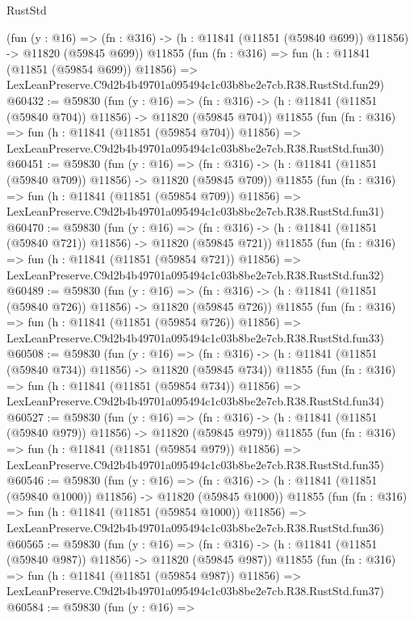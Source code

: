 \begin{lexlean}{RustStd}
\begin{coremodule}
    (fun (y : @16) =>
    (fn : @316) -> (h : @11841 (@11851 (@59840 @699)) @11856) -> @11820 (@59845 @699))
    @11855
    (fun (fn : @316) =>
    fun (h : @11841 (@11851 (@59854 @699)) @11856) =>
    LexLeanPreserve.C9d2b4b49701a095494c1c03b8be2e7cb.R38.RustStd.fun29)
@60432 := @59830
    (fun (y : @16) =>
    (fn : @316) -> (h : @11841 (@11851 (@59840 @704)) @11856) -> @11820 (@59845 @704))
    @11855
    (fun (fn : @316) =>
    fun (h : @11841 (@11851 (@59854 @704)) @11856) =>
    LexLeanPreserve.C9d2b4b49701a095494c1c03b8be2e7cb.R38.RustStd.fun30)
@60451 := @59830
    (fun (y : @16) =>
    (fn : @316) -> (h : @11841 (@11851 (@59840 @709)) @11856) -> @11820 (@59845 @709))
    @11855
    (fun (fn : @316) =>
    fun (h : @11841 (@11851 (@59854 @709)) @11856) =>
    LexLeanPreserve.C9d2b4b49701a095494c1c03b8be2e7cb.R38.RustStd.fun31)
@60470 := @59830
    (fun (y : @16) =>
    (fn : @316) -> (h : @11841 (@11851 (@59840 @721)) @11856) -> @11820 (@59845 @721))
    @11855
    (fun (fn : @316) =>
    fun (h : @11841 (@11851 (@59854 @721)) @11856) =>
    LexLeanPreserve.C9d2b4b49701a095494c1c03b8be2e7cb.R38.RustStd.fun32)
@60489 := @59830
    (fun (y : @16) =>
    (fn : @316) -> (h : @11841 (@11851 (@59840 @726)) @11856) -> @11820 (@59845 @726))
    @11855
    (fun (fn : @316) =>
    fun (h : @11841 (@11851 (@59854 @726)) @11856) =>
    LexLeanPreserve.C9d2b4b49701a095494c1c03b8be2e7cb.R38.RustStd.fun33)
@60508 := @59830
    (fun (y : @16) =>
    (fn : @316) -> (h : @11841 (@11851 (@59840 @734)) @11856) -> @11820 (@59845 @734))
    @11855
    (fun (fn : @316) =>
    fun (h : @11841 (@11851 (@59854 @734)) @11856) =>
    LexLeanPreserve.C9d2b4b49701a095494c1c03b8be2e7cb.R38.RustStd.fun34)
@60527 := @59830
    (fun (y : @16) =>
    (fn : @316) -> (h : @11841 (@11851 (@59840 @979)) @11856) -> @11820 (@59845 @979))
    @11855
    (fun (fn : @316) =>
    fun (h : @11841 (@11851 (@59854 @979)) @11856) =>
    LexLeanPreserve.C9d2b4b49701a095494c1c03b8be2e7cb.R38.RustStd.fun35)
@60546 := @59830
    (fun (y : @16) =>
    (fn : @316) -> (h : @11841 (@11851 (@59840 @1000)) @11856) -> @11820 (@59845 @1000))
    @11855
    (fun (fn : @316) =>
    fun (h : @11841 (@11851 (@59854 @1000)) @11856) =>
    LexLeanPreserve.C9d2b4b49701a095494c1c03b8be2e7cb.R38.RustStd.fun36)
@60565 := @59830
    (fun (y : @16) =>
    (fn : @316) -> (h : @11841 (@11851 (@59840 @987)) @11856) -> @11820 (@59845 @987))
    @11855
    (fun (fn : @316) =>
    fun (h : @11841 (@11851 (@59854 @987)) @11856) =>
    LexLeanPreserve.C9d2b4b49701a095494c1c03b8be2e7cb.R38.RustStd.fun37)
@60584 := @59830
    (fun (y : @16) =>

\end{coremodule}
\end{lexlean}
